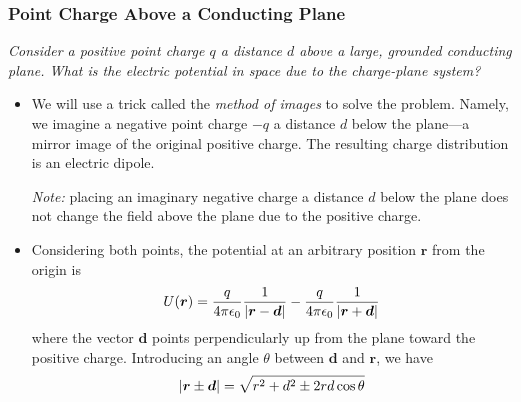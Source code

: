 \documentclass[11pt, a4paper]{article}
\renewcommand{\vec}[1]{\bm{#1}} %
\renewcommand{\r}{\vec{r}}
\newcommand{\e}{\epsilon_{0}} %
\begin{document}
\subsubsection{Point Charge Above a Conducting Plane}
\textit{Consider a positive point charge $ q $ a distance $ d $ above a large, grounded conducting plane. What is the electric potential in space due to the charge-plane system?}
\begin{itemize}
	\item We will use a trick called the \textit{method of images} to solve the problem. 
	Namely, we imagine a negative point charge $ -q $ a distance $ d $ below the plane---a mirror image of the original positive charge. The resulting charge distribution is an electric dipole. 
	
	\textit{Note:} placing an imaginary negative charge a distance $ d $ below the plane does not change the field above the plane due to the positive charge. 
	
	\item Considering both points, the potential at an arbitrary position $ \r $ from the origin is
	\begin{equation*}
		U(\r) = \frac{q}{4\pi \e}\frac{1}{\abs{\r - \vec{d}}} - \frac{q}{4\pi \e}\frac{1}{\abs{\r + \vec{d}}} 
	\end{equation*}
	where the vector $ \vec{d} $ points perpendicularly up from the plane toward the positive charge. Introducing an angle $ \theta $ between $ \vec{d} $ and $ \r $, we have
	\begin{equation*}
		\abs{\r \pm \vec{d}} = \sqrt{r^{2}+d^{2} \pm 2rd\cos \theta}
	\end{equation*}
	

\end{itemize}
\end{document}
